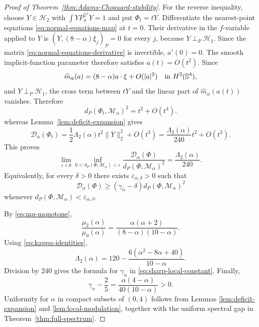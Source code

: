 \documentclass[11pt]{article}
\numberwithin{equation}{section}
\begin{document}
\begin{proof}[Proof of Theorem~\ref{thm:Adams-Choquard-stability}]
For the reverse inequality, choose \(Y\in\mathcal H_2\) with
\(\int YP_{4}^{\mathbb S^{4}}Y=1\) and put \(\Phi_t=tY\). Differentiate the nearest-point equations
\eqref{eq:normal-equations-map} at \(t=0\). Their derivative in the
\(f\)-variable applied to \(Y\) is
\((Y,(8-\alpha)\xi_j)_P=0\) for every \(j\), because
\(Y\perp_P\mathcal H_1\). Since the matrix
\eqref{eq:normal-equations-derivative} is invertible, \(a'(0)=0\). The smooth implicit-function parameter therefore satisfies
\(a(t)=O(t^{2})\). Since
\[
\widehat m_{\alpha}(a)
=(8-\alpha)a\cdot\xi+O(|a|^{2})
\quad\hbox{in }H^{2}(\mathbb S^{4}),
\]
and \(Y\perp_{P}\mathcal H_{1}\), the cross term between \(tY\) and the
linear part of \(\widehat m_{\alpha}(a(t))\) vanishes. Therefore
\begin{equation*}
d_P(\Phi_t,\mathcal M_\alpha)^{2}=t^{2}+O(t^{4}).
\end{equation*}
whereas Lemma~\ref{lem:deficit-expansion} gives
\begin{equation*}
\mathcal D_\alpha(\Phi_t)
=\frac12\Lambda_2(\alpha)t^{2}\|Y\|_2^{2}+O(t^{3})
=\frac{\Lambda_2(\alpha)}{240}t^{2}+O(t^{3}).
\end{equation*}
This proves
\begin{equation*}
\lim_{\varepsilon\downarrow0}
\inf_{0<d_{P}(\Phi,\mathcal M_{\alpha})<\varepsilon}
\frac{\mathcal D_{\alpha}(\Phi)}
{d_{P}(\Phi,\mathcal M_{\alpha})^{2}}
=\frac{\Lambda_{2}(\alpha)}{240}.
\end{equation*}
Equivalently, for every \(\delta>0\) there exists
\(\varepsilon_{\alpha,\delta}>0\) such that
\begin{equation*}
\mathcal D_{\alpha}(\Phi)
\geq(\gamma_{\alpha}-\delta)
 d_P(\Phi,\mathcal M_{\alpha})^{2}
\end{equation*}
whenever \(d_P(\Phi,\mathcal M_\alpha)<\varepsilon_{\alpha,\delta}\).

By \eqref{eq:mu-monotone},
\begin{equation*}
\frac{\mu_{2}(\alpha)}{\mu_{0}(\alpha)}
=\frac{\alpha(\alpha+2)}{(8-\alpha)(10-\alpha)}.
\end{equation*}
Using \eqref{eq:kappa-identities},
\begin{equation*}
\Lambda_{2}(\alpha)
=120-\frac{6(\alpha^{2}-8\alpha+40)}{10-\alpha}.
\end{equation*}
Division by \(240\) gives the formula for \(\gamma_{\alpha}\) in
\eqref{eq:sharp-local-constant}. Finally,
\begin{equation*}
\gamma_{\alpha}-\frac25
=\frac{\alpha(4-\alpha)}{40(10-\alpha)}>0.
\end{equation*}
Uniformity for \(\alpha\) in compact subsets of \((0,4)\) follows from Lemmas
\ref{lem:deficit-expansion} and \ref{lem:local-modulation}, together with the
uniform spectral gap in Theorem~\ref{thm:full-spectrum}.
\end{proof}
\end{document}
